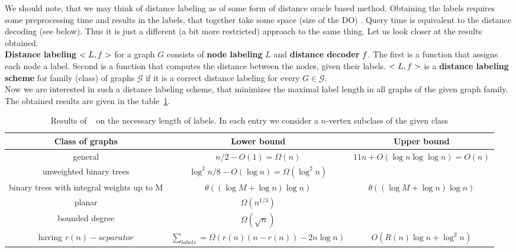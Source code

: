 \documentclass[a4paper]{article}
\begin{document}
        We should note, that we may think of distance labeling as of some form of distance oracle based method. Obtaining the labels requires some preprocessing time and results in the labels, that together take some space (size of the DO) . Query time is equivalent to the distance decoding (see below). Thus it is just a different (a bit more restricted) approach to the same thing. Let us look closer at the results obtained.\\

        \def\defdistlab{\textbf{Distance labeling} $<L, \mathnormal{f}>$ for a graph $G$ consists of \textbf{node labeling} $L$ and \textbf{distance decoder} $\mathnormal{f}$. The first is a function that assigns each node a label. Second is a function that computes the distance between the nodes, given their labels. $<L, \mathnormal{f}>$ is a \textbf{distance labeling scheme} for family (class) of graphs $\mathcal{G}$ if it is a correct distance labeling for every $G \in \mathcal{G}$.}\defdistlab \\

        Now we are interested in such a distance labeling scheme, that minimizes the maximal label length in all graphs of the given graph family. The obtained results are given in the table~\ref{tab:distlab}. \\

        \begin{table}[h!]
            \caption{\label{tab:distlab} Results of ~\cite{distlabel04} on the necessary length of labels. In each entry we consider a $n$-vertex subclass of the given class}
            \small
            \begin{tabular}{c|c|c}
                \hline
                    \rowcolor{tablehead}
                    \textbf{Class of graphs} & \textbf{Lower bound} & \textbf{Upper bound} \\
                \hline
                    general & $n/2 - O(1) = \Omega(n)$ & $11n + O(\log n \log\log n) = O(n)$ \\
                    unweighted binary trees & $\log^{2} n/8 - O(\log n) = \Omega(\log^{2} n)$ & \\
                    binary trees with integral weights up to M & $\theta((\log M + \log n)\log n)$ & $\theta((\log M + \log n)\log n)$ \\
                    planar & $\Omega(n^{1/3})$ &  \\
                    bounded degree & $\Omega(\sqrt{n})$ & \\
                    having $r(n)-separator$ & $\sum_{labels} = \Omega(r(n)(n - r(n)) - 2n \log n)$ & $O(R(n) \log n + \log^{2} n)$ \\
            \end{tabular}
            \normalsize
        \end{table}
\end{document}
